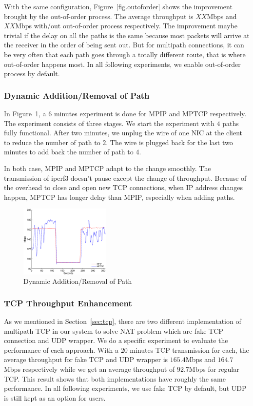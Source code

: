 With the same configuration, Figure~\ref{fig.outoforder} shows the improvement brought by the out-of-order process. The average throughput is $XX$Mbps and $XX$Mbps with/out out-of-order process respectively. The improvement maybe trivial if the delay on all the paths is the same because most packets will arrive at the receiver in the order of being sent out. But for multipath connections, it can be very often that each path goes through a totally different route, that is where out-of-order happens most. In all following experiments, we enable out-of-order process by default.

\subsubsection{Dynamic Addition/Removal of Path}
\label{sec:switch}

In Figure~\ref{fig.switch}, a $6$ minutes experiment is done for MPIP and MPTCP respectively. The experiment consists of three stages. We start the experiment with $4$ paths fully functional. After two minutes, we unplug the wire of one NIC at the client to reduce the number of path to $2$. The wire is plugged back for the last two minutes to add back the number of path to $4$.

In both case, MPIP and MPTCP adapt to the change smoothly. The transmission of iperf3 doesn't pause except the change of throughput. Because of the overhead to close and open new TCP connections, when IP address changes happen, MPTCP has longer delay than MPIP, especially when adding paths.

\begin{figure}
\centering
\includegraphics[width=0.8\linewidth,height=1.4in]{fig/switch.eps}
\caption{Dynamic Addition/Removal of Path}
\label{fig.switch}
\end{figure}


\subsubsection{TCP Throughput Enhancement}
\label{sec:tcptp}

As we mentioned in Section~\ref{sec:tcp}, there are two different implementation of multipath TCP in our system to solve NAT problem which are fake TCP connection and UDP wrapper. We do a specific experiment to evaluate the performance of each approach. With a $20$ minutes TCP transmission for each, the average throughput for fake TCP and UDP wrapper is $165.4$Mbps and $164.7$Mbps respectively while we get an average throughput of $92.7$Mbps for regular TCP. This result shows that both implementations have roughly the same performance. In all following experiments, we use fake TCP by default, but UDP is still kept as an option for users.


